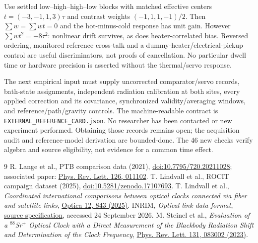 \documentclass[11pt,a4paper]{article}
\begin{document}
Use settled low--high--high--low blocks with matched effective centers
$t=(-3,-1,1,3)\tau$ and contrast weights $(-1,1,1,-1)/2$.
Then $\sum w=\sum wt=0$ and the hot-minus-cold response has unit gain.
However $\sum wt^2=-8\tau^2$: nonlinear drift survives, as does
heater-correlated bias. Reversed ordering, monitored reference
cross-talk and a dummy-heater/electrical-pickup control are useful
discriminators, not proofs of cancellation. No particular dwell time
or hardware precision is asserted without the thermal/servo response.

The next empirical input must supply uncorrected comparator/servo
records, bath-state assignments, independent radiation calibration at
both sites, every applied correction and its covariance, synchronized
validity/averaging windows, and reference/path/gravity controls. The
machine-readable contract is \texttt{EXTERNAL\_REFERENCE\_CARD.json}.
No researcher has been contacted or new experiment performed. Obtaining
those records remains open; the acquisition audit and reference-model
derivation are bounded-done. The 46 new checks verify algebra and source
eligibility, not evidence for a common time effect.

\begin{thebibliography}{9}\small
{} R. Lange et al., PTB comparison data (2021),
\href{https://doi.org/10.7795/720.20211028}{doi:10.7795/720.20211028};
associated paper: \href{https://doi.org/10.1103/PhysRevLett.126.011102}{Phys. Rev. Lett. 126, 011102}.
 T. Lindvall et al., ROCIT campaign dataset (2025),
\href{https://doi.org/10.5281/zenodo.17107693}{doi:10.5281/zenodo.17107693}.
 T. Lindvall et al., \emph{Coordinated international
comparisons between optical clocks connected via fiber and satellite
links}, \href{https://doi.org/10.1364/OPTICA.561754}{Optica 12, 843 (2025)}.
 INRIM, \emph{Optical link data format},
\href{https://github.com/INRIM/optical-link-data-format}{source specification}, accessed 24 September 2026.
 M. Steinel et al., \emph{Evaluation of a $^{88}$Sr$^+$
Optical Clock with a Direct Measurement of the Blackbody Radiation
Shift and Determination of the Clock Frequency},
\href{https://doi.org/10.1103/PhysRevLett.131.083002}{Phys. Rev. Lett. 131, 083002 (2023)}.
\end{thebibliography}
\end{document}
